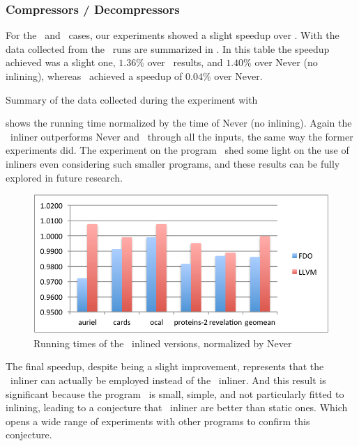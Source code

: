 \subsubsection{Compressors / Decompressors}

For the \bzip\ and \gzip\ cases, our experiments showed a slight speedup over \llvm. With the data collected from the \bzip\ runs are summarized in . In this table the speedup achieved was a slight one, $1.36 \%$ over \llvm\ results, and $1.40 \%$ over Never (no inlining), whereas \llvm\ achieved a speedup of $0.04 \%$ over Never.

\begin{table}
  \centering
  \begin{tiny}
  
  \end{tiny}
  \caption{Summary of the data collected during the experiment with \bzip}
  \label{tab:speedupb}
\end{table}

 shows the running time normalized by the time of Never (no inlining). Again the \FDI\ inliner outperforms Never and \llvm\ through all the inputs, the same way the former experiments did. The experiment on the program \bzip\ shed some light on the use of inliners even considering such smaller programs, and these results can be fully explored in future research.

\begin{figure}
  \centering
  \includegraphics[width=1.00\linewidth]{Figures/speedupb}
  \caption{Running times of the \bzip\ inlined versions, normalized by Never}
  \label{fig:speedup}
\end{figure}

The final speedup, despite being a slight improvement, represents that the \FDI\ inliner can actually be employed instead of the \llvm\ inliner. And this result is significant because the program \bzip\ is small, simple, and not particularly fitted to inlining, leading to a conjecture that \FDI\ inliner are better than static ones. Which opens a wide range of experiments with other programs to confirm this conjecture.

